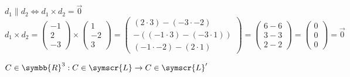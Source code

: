 \documentclass{article}
\def\fancyL{\symscr{L}}
\def\realR{\symbb{R}}
\begin{document}
\begin{enumerate}
\begin{itemize}
\begin{enumerate}[label=\listAlph]
                        \ResetCases{}    
                        \begin{mathcase}{\(d_1 \parallel d_2 \iff d_1 \times d_2 = \vec{0}\)}  
                            \[
                                    d_1 \times d_2 =
                                    \begin{pmatrix}
                                        -1 \\ 2 \\ -3
                                    \end{pmatrix}
                                    \times
                                    \begin{pmatrix}
                                        1 \\ -2 \\ 3
                                    \end{pmatrix}
                                    =
                                    \begin{pmatrix}
                                        (2 \cdot 3) - (-3 \cdot -2) \\
                                        -( (-1 \cdot 3) - (-3 \cdot 1) ) \\
                                        (-1 \cdot -2) - (2 \cdot 1)
                                    \end{pmatrix}
                                    =
                                    \begin{pmatrix}
                                        6 - 6 \\
                                        3 - 3 \\
                                        2 - 2 
                                    \end{pmatrix}
                                    = 
                                    \begin{pmatrix}
                                        0 \\ 0 \\ 0
                                    \end{pmatrix}
                                    = 
                                    \vec{0}
                            \]
                        \end{mathcase}
                        \begin{mathcase}{\(C \in \realR^3: C \in \fancyL \rightarrow C \in \fancyL'\)}
                            \[
\]
\end{mathcase}
\end{enumerate}
\end{itemize}
\end{enumerate}
\end{document}
